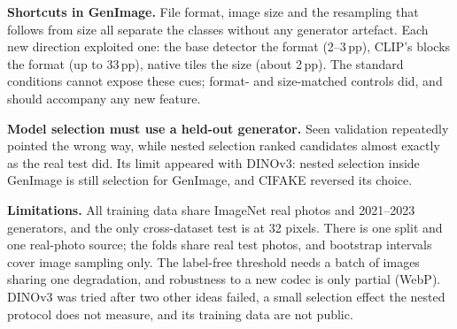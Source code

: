 \documentclass[10pt,a4paper]{article}
\newcommand{\pp}{\,pp}
\begin{document}
\textbf{Shortcuts in GenImage.} File format, image size and the resampling that follows from size all separate the classes without any generator artefact. Each new direction exploited one: the base detector the format (2--3\pp), CLIP's blocks the format (up to 33\pp), native tiles the size (about 2\pp). The standard conditions cannot expose these cues; format- and size-matched controls did, and should accompany any new feature.

\textbf{Model selection must use a held-out generator.} Seen validation repeatedly pointed the wrong way, while nested selection ranked candidates almost exactly as the real test did. Its limit appeared with DINOv3: nested selection inside GenImage is still selection for GenImage, and CIFAKE reversed its choice.

\textbf{Limitations.} All training data share ImageNet real photos and 2021--2023 generators, and the only cross-dataset test is at 32 pixels. There is one split and one real-photo source; the folds share real test photos, and bootstrap intervals cover image sampling only. The label-free threshold needs a batch of images sharing one degradation, and robustness to a new codec is only partial (WebP). DINOv3 was tried after two other ideas failed, a small selection effect the nested protocol does not measure, and its training data are not public.

\end{document}
